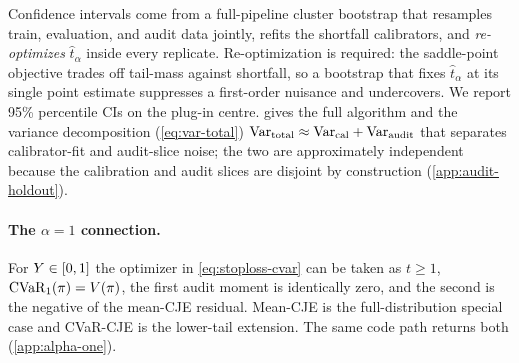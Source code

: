 Confidence intervals come from a full-pipeline cluster bootstrap that
resamples train, evaluation, and audit data jointly, refits the
shortfall calibrators, and \emph{re-optimizes} $\hat t_\alpha$ inside
every replicate. Re-optimization is required: the saddle-point
objective trades off tail-mass against shortfall, so a bootstrap that
fixes $\hat t_\alpha$ at its single point estimate suppresses a
first-order nuisance and undercovers. We report 95\% percentile CIs on
the plug-in centre.  gives the full algorithm and the variance
decomposition (\cref{eq:var-total})
$\mathrm{Var}_{\mathrm{total}} \approx \mathrm{Var}_{\mathrm{cal}} + \mathrm{Var}_{\mathrm{audit}}$
that separates calibrator-fit and audit-slice noise; the two are
approximately independent because the calibration and audit slices are
disjoint by construction (\cref{app:audit-holdout}).

\paragraph{The $\alpha = 1$ connection.}
For $Y \in [0, 1]$ the optimizer in \cref{eq:stoploss-cvar} can be
taken as $t \ge 1$, $\mathrm{CVaR}_1(\pi) = V(\pi)$, the first audit
moment is identically zero, and the second is the negative of the
mean-CJE residual. Mean-CJE is the full-distribution special case and
CVaR-CJE is the lower-tail extension. The same code path returns both
(\cref{app:alpha-one}).
